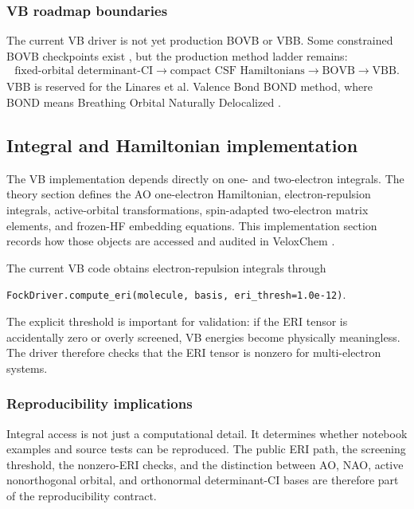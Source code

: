 \documentclass[11pt]{article}
\begin{document}
\subsubsection*{VB roadmap boundaries}

The current VB driver is not yet production BOVB or VBB.  Some constrained BOVB checkpoints exist \cite{BOVB}, but the production method ladder remains:
\begin{equation}
\begin{aligned}
	\text{fixed-orbital determinant-CI}
	\rightarrow \text{compact CSF Hamiltonians}
	\rightarrow \text{BOVB}
	\rightarrow \text{VBB}.
\end{aligned}
\end{equation}
VBB is reserved for the Linares et al. Valence Bond BOND method, where BOND means Breathing Orbital Naturally Delocalized \cite{LinaresVBB}.

\subsection{Integral and Hamiltonian implementation}

The VB implementation depends directly on one- and two-electron integrals.  The theory section defines the AO one-electron Hamiltonian, electron-repulsion integrals, active-orbital transformations, spin-adapted two-electron matrix elements, and frozen-HF embedding equations.  This implementation section records how those objects are accessed and audited in VeloxChem \cite{VeloxChem}.

The current VB code obtains electron-repulsion integrals through
\begin{center}
\texttt{FockDriver.compute\_eri(molecule, basis, eri\_thresh=1.0e-12)}.
\end{center}
The explicit threshold is important for validation: if the ERI tensor is accidentally zero or overly screened, VB energies become physically meaningless.  The driver therefore checks that the ERI tensor is nonzero for multi-electron systems.

\subsubsection*{Reproducibility implications}

Integral access is not just a computational detail.  It determines whether notebook examples and source tests can be reproduced.  The public ERI path, the screening threshold, the nonzero-ERI checks, and the distinction between AO, NAO, active nonorthogonal orbital, and orthonormal determinant-CI bases are therefore part of the reproducibility contract.
\end{document}

